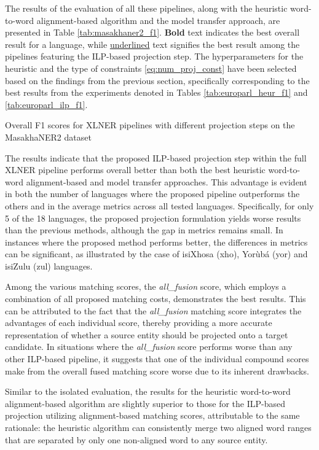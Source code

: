 The results of the evaluation of all these pipelines, along with the heuristic
word-to-word alignment-based algorithm and the model transfer approach, are presented
in Table \ref{tab:masakhaner2_f1}. \textbf{Bold} text indicates the best overall result for a
language, while \underline{underlined} text signifies the best result among the pipelines featuring
the ILP-based projection step. The hyperparameters for the heuristic and the type of
constraints \eqref{eq:num_proj_const} have been selected based on the findings from the
previous section, specifically corresponding to the best results from the experiments
denoted in Tables \ref{tab:europarl_heur_f1} and \ref{tab:europarl_ilp_f1}.

\begin{table}[ht]
  
  \caption{Overall F1 scores for XLNER pipelines with different projection steps on the
  MasakhaNER2 dataset}
  \label{tab:masakhaner2_f1}
\end{table}

The results indicate that the proposed ILP-based projection step within the full
XLNER pipeline performs overall better than both the best heuristic word-to-word
alignment-based and model transfer approaches. This advantage is evident in both
the number of languages where the proposed pipeline outperforms the others and in
the average metrics across all tested languages. Specifically, for only 5 of the 18
languages, the proposed projection formulation yields worse results than the previous
methods, although the gap in metrics remains small. In instances where the proposed
method performs better, the differences in metrics can be significant, as illustrated
by the case of isiXhosa (xho), Yorùbá (yor) and isiZulu (zul) languages.

Among the various matching scores, the \textit{all\_fusion} score, which employs a
combination of all proposed matching costs, demonstrates the best results. This can
be attributed to the fact that the \textit{all\_fusion} matching score integrates the advantages
of each individual score, thereby providing a more accurate representation of whether
a source entity should be projected onto a target candidate. In situations where the
\textit{all\_fusion} score performs worse than any other ILP-based pipeline, it
suggests that one of the individual compound scores make from the overall
fused matching score worse due to its inherent drawbacks.

Similar to the isolated evaluation, the results for the heuristic word-to-word
alignment-based algorithm are slightly superior to those for the ILP-based projection
utilizing alignment-based matching scores, attributable to the same rationale: the
heuristic algorithm can consistently merge two aligned word ranges that are separated
by only one non-aligned word to any source entity.


